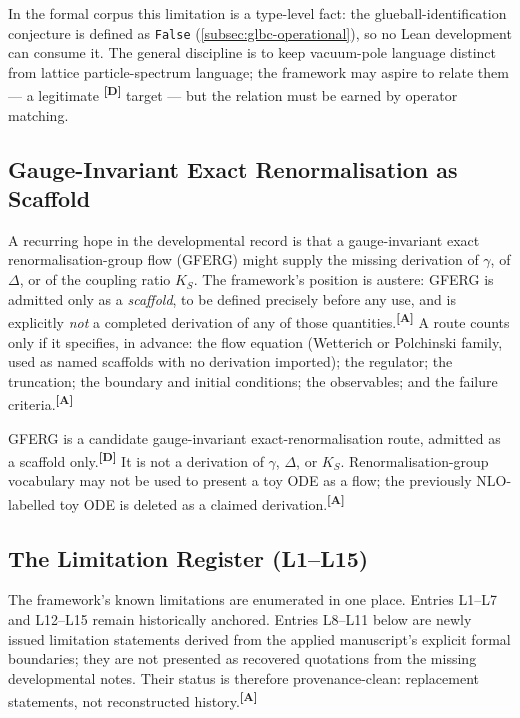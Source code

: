 \documentclass[12pt,a4paper,twoside]{article}
\theoremstyle{plain}
\theoremstyle{definition}
\theoremstyle{remark}
\newcommand{\catmark}[1]{\textsuperscript{\textsf{\textbf{[#1]}}}}
\begin{document}
\noindent In the formal corpus this limitation is a type-level fact: the
glueball-identification conjecture is defined as \texttt{False}
(\cref{subsec:glbc-operational}), so no Lean development can consume it.
The general discipline is to keep vacuum-pole language distinct from
lattice particle-spectrum language; the framework may aspire to relate
them --- a legitimate \catmark{D} target --- but the relation must be
earned by operator matching.

\subsection{Gauge-Invariant Exact Renormalisation as Scaffold}
\label{subsec:gferg-scaffold}

A recurring hope in the developmental record is that a gauge-invariant
exact renormalisation-group flow (GFERG) might supply the missing
derivation of $\gamma$, of $\Delta$, or of the coupling ratio $K_S$. The
framework's position is austere: GFERG is admitted only as a
\emph{scaffold}, to be defined precisely before any use, and is
explicitly \emph{not} a completed derivation of any of those
quantities.\catmark{A} A route counts only if it specifies, in advance:
the flow equation (Wetterich or Polchinski family, used as named
scaffolds with no derivation imported); the regulator; the truncation;
the boundary and initial conditions; the observables; and the failure
criteria.\catmark{A}

\begin{governancebox}
GFERG is a candidate gauge-invariant exact-renormalisation route,
admitted as a scaffold only.\catmark{D} It is not a derivation of
$\gamma$, $\Delta$, or $K_S$. Renormalisation-group vocabulary may not
be used to present a toy ODE as a flow; the previously NLO-labelled toy
ODE is deleted as a claimed derivation.\catmark{A}
\end{governancebox}

\subsection{The Limitation Register (L1--L15)}
\label{subsec:limitation-register}

The framework's known limitations are enumerated in one place. Entries
L1--L7 and L12--L15 remain historically anchored. Entries L8--L11 below
are newly issued limitation statements derived from the applied
manuscript's explicit formal boundaries; they are not presented as
recovered quotations from the missing developmental notes. Their status
is therefore provenance-clean: replacement statements, not reconstructed
history.\catmark{A}
\end{document}
